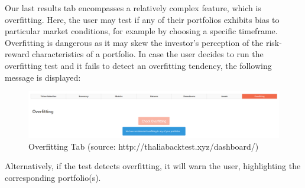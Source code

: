 \documentclass[main.tex]{subfiles}
\begin{document}
Our last results tab encompasses a relatively complex feature, which is overfitting. Here, the user may test if any of their portfolios exhibits bias to particular market conditions, for example by choosing a specific timeframe. Overfitting is dangerous as it may skew the investor's perception of the risk-reward characteristics of a portfolio. In case the user decides to run the overfitting test and it fails to detect an overfitting tendency, the following message is displayed:

\begin{figure}[H]
   \centering
   \includegraphics[width=\textwidth]{08Appendices/081User/081Pictures/overfitting.png}
   \caption{Overfitting Tab (source: http://thaliabacktest.xyz/dashboard/)}
   \label{overfitting}
\end{figure}

Alternatively, if the test detects overfitting, it will warn the user, highlighting the corresponding portfolio(s).
\end{document}
